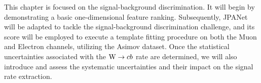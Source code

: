 \label{sec:signal}
\vspace{-1cm}
\minitoc
This chapter is focused on the signal-background discrimination. It will begin by demonstrating a basic one-dimensional feature ranking. Subsequently, JPANet will be adapted to tackle the signal-background discrimination challenge, and its score will be employed to execute a template fitting procedure on both the Muon and Electron channels, utilizing the Asimov dataset.
Once the statistical uncertainties associated with the ${\text{W}} \to cb$ rate are determined, we will also introduce and assess the systematic uncertainties and their impact on the signal rate extraction.
\begin{minipage}[H]{\linewidth}
\begin{minipage}{0.35\linewidth}
        \centering

\end{minipage}
\end{minipage}

